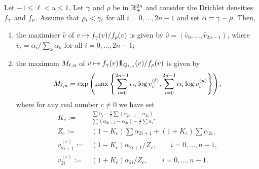 \documentclass[10pt, article,table]{article}
\begin{document}
\begin{lemma}\label{lemma.bound_on_dirratio}
 Let  $-1\leq \ell < u \leq 1$. Let $\dirparam$ and $\rho$ be in $\R_{+}^{2n}$ and consider the Drichlet densities $\dirichletDensity[\dirparam]$ and $\dirichletDensity[\rho]$. Assume that $\rho_i < \dirparam_i$ for all $i=0,\dots,2n-1$ and set $\alpha=\dirparam-\rho$.  Then,
\begin{enumerate}[label={\roman{*}.}, ref={\ref{lemma.proposal_dirparam}.\roman{*}}]
  \item the maximiser $\hat{v}$ of $v\mapsto \dirichletDensity[\dirparam](v)/\dirichletDensity[\rho](v)$ is given by 
 $\hat{v} = (\hat{v}_0 , \dots,  \hat{v}_{2n-1})$, where $\hat{v}_{i} = \alpha_{i}/\sum_{k} \alpha_k$ for all $i=0,\dots,2n-1$;
 \item the maximum $M\subscriptellu$ of $v\mapsto \dirichletDensity[\dirparam](v)\one_{Q\subscriptellu}(v)/\dirichletDensity[\rho](v)$ is given by 
 \begin{equation}\label{eq.Mellu}
  M\subscriptellu
  =
  \exp\left(
  \max\left\lbrace
  \sum_{i=0}^{2n-1} \alpha_i \log v_i^{(\ell)},
  \sum_{i=0}^{2n-1} \alpha_i \log v_i^{(u)}
  \right\rbrace
  \right),
 \end{equation}
where for any real number $c\neq 0$ we have set
\begin{equation*}
 \begin{split}
    K_c :=& \frac{\sum \alpha_i - \frac{1}{c}\sum(\alpha_{2i+1} - \alpha_{2i})}{\sum (\alpha_{2i+1}-\alpha_{2i}) - \frac{1}{c} \sum \alpha_i},
   \\
   Z_c :=& (1-K_c) \sum \alpha_{2i+1} + (1+K_c)\sum \alpha_{2i},
   \\
   v_{2i+1}^{(c)}:=& (1-K_c)\alpha_{2i+1}/Z_c, \qquad i=0,\dots,n-1,
   \\
   v_{2i}^{(c)}:=& (1+K_c)\alpha_{2i}/Z_c, \qquad i=0,\dots,n-1.
 \end{split}
\end{equation*}
\end{enumerate}
\end{lemma}
\end{document}
